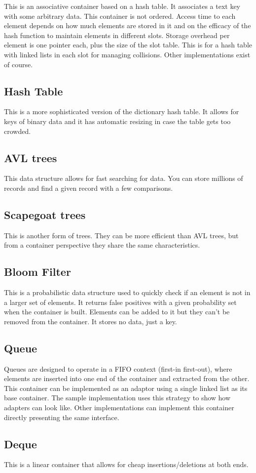 \documentclass[12pt,a4paper]{memoir} %
\begin{document}
This is an associative container based on a hash table. It associates a text key with some arbitrary data. This container is not ordered. Access time to each element depends on how much elements are stored in it and on the efficacy of the hash function to maintain elements in different slots. Storage overhead per element is one pointer each, plus the size of the slot table. This is for a hash table with linked lists in each slot for managing collisions. Other implementations exist of course.
\subsection{Hash Table}
This is a more sophisticated version of the dictionary hash table. It allows for keys of binary data and it has automatic resizing in case the table gets too crowded.
\subsection{AVL trees}
This data structure allows for fast searching for data. You can store millions of records and find a given record with a few comparisons.
\subsection{Scapegoat trees}
This is another form of trees. They can be more efficient than AVL trees, but from a container perspective they share the same characteristics.
\subsection{Bloom Filter}
This is a probabilistic data structure used to quickly check if an element is not in a larger set of elements. It returns false positives with a given probability set when the container is built. Elements can be added to it but they can't be removed from the container. It stores no data, just a key.
\subsection{Queue}
Queues are designed to operate in a FIFO context (first-in first-out), where elements are inserted into one end of the container and extracted from the 
other. This container can be implemented as an adaptor using a single linked list as its base container. The sample implementation uses this strategy 
to show how adapters can look like. Other implementations can implement this container directly presenting the same interface.
\subsection{Deque}
This is a linear container that allows for cheap insertions/deletions at both ends.
\end{document}
